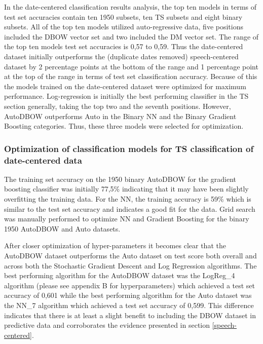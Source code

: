 \documentclass[11pt,preprint, authoryear]{elsarticle}
\numberwithin{equation}{section}
\numberwithin{figure}{section}
\numberwithin{table}{section}
\begin{document}
In the date-centered classification results analysis, the top ten models
in terms of test set accuracies contain ten 1950 subsets, ten TS subsets
and eight binary subsets. All of the top ten models utilized
auto-regressive data, five positions included the DBOW vector set and
two included the DM vector set. The range of the top ten models test set
accuracies is 0,57 to 0,59. Thus the date-centered dataset initially
outperforms the (duplicate dates removed) speech-centered dataset by 2
percentage points at the bottom of the range and 1 percentage point at
the top of the range in terms of test set classification accuracy.
Because of this the models trained on the date-centered dataset were
optimized for maximum performance. Log-regression is initially the best
performing classifier in the TS section generally, taking the top two
and the seventh positions. However, AutoDBOW outperforms Auto in the
Binary NN and the Binary Gradient Boosting categories. Thus, these three
models were selected for optimization.

\hypertarget{optimization-of-classification-models-for-ts-classification-of-date-centered-data}{%
\subsubsection{Optimization of classification models for TS
classification of date-centered
data}\label{optimization-of-classification-models-for-ts-classification-of-date-centered-data}}

The training set accuracy on the 1950 binary AutoDBOW for the gradient
boosting classifier was initially 77,5\% indicating that it may have
been slightly overfitting the training data. For the NN, the training
accuracy is 59\% which is similar to the test set accuracy and indicates
a good fit for the data. Grid search was manually performed to optimize
NN and Gradient Boosting for the binary 1950 AutoDBOW and Auto datasets.

After closer optimization of hyper-parameters it becomes clear that the
AutoDBOW dataset outperforms the Auto dataset on test score both overall
and across both the Stochastic Gradient Descent and Log Regression
algorithms. The best performing algorithm for the AutoDBOW dataset was
the LogReg\_4 algorithm (please see appendix B for hyperparameters)
which achieved a test set accuracy of 0,601 while the best performing
algorithm for the Auto dataset was the NN\_7 algorithm which achieved a
test set accuracy of 0,599. This difference indicates that there is at
least a slight benefit to including the DBOW dataset in predictive data
and corroborates the evidence presented in section
\ref{speech-centered}.
\end{document}
